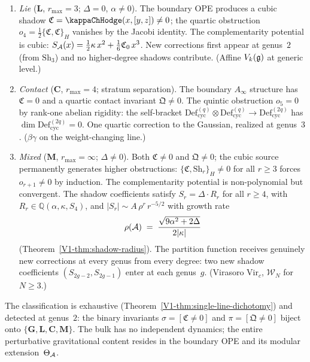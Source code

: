 \begin{theorem}
\begin{enumerate}[label=\textup{(\roman*)}]
\item \emph{Lie} ($\mathbf{L}$, $r_{\max} = 3$;
 $\Delta = 0$, $\alpha \neq 0$).
 The boundary OPE produces a cubic shadow
 $\mathfrak{C} = \kappaChHodge(x,[y,z]) \neq 0$;
 the quartic obstruction $o_4 =
 \tfrac{1}{2}\{\mathfrak{C},\mathfrak{C}\}_H$ vanishes
 by the Jacobi identity.
 The complementarity potential is cubic:
 $S_{\mathcal{A}}(x) = \tfrac{1}{2}\kappa\,x^2 +
 \tfrac{1}{6}\mathfrak{C}_0\,x^3$.
 New corrections first appear at genus~$2$
 \textup{(}from $\mathrm{Sh}_3$\textup{)} and no
 higher-degree shadows contribute.
 \textup{(}Affine $V_k(\mathfrak{g})$ at generic level.\textup{)}

\item \emph{Contact} ($\mathbf{C}$, $r_{\max} = 4$;
 stratum separation\textup{)}.
 The boundary $A_\infty$ structure has
 $\mathfrak{C} = 0$ and a quartic contact invariant
 $\mathfrak{Q} \neq 0$.
 The quintic obstruction $o_5 = 0$ by rank-one abelian
 rigidity: the self-bracket
 $\mathrm{Def}_{\mathrm{cyc}}^{(q)} \otimes
 \mathrm{Def}_{\mathrm{cyc}}^{(q)} \to
 \mathrm{Def}_{\mathrm{cyc}}^{(2q)}$ has
 $\dim\mathrm{Def}_{\mathrm{cyc}}^{(2q)} = 0$.
 One quartic correction to the Gaussian, realized at
 genus~$3$.
 \textup{(}$\beta\gamma$ on the weight-changing line.\textup{)}

\item \emph{Mixed} ($\mathbf{M}$, $r_{\max} = \infty$;
 $\Delta \neq 0$).
 Both $\mathfrak{C} \neq 0$ and $\mathfrak{Q} \neq 0$;
 the cubic source permanently generates higher obstructions:
 $\{\mathfrak{C}, \mathrm{Sh}_r\}_H \neq 0$ for all
 $r \geq 3$ forces $o_{r+1} \neq 0$ by induction.
 The complementarity potential is non-polynomial but
 convergent. The shadow coefficients satisfy
 $S_r = \Delta \cdot R_r$ for all $r \geq 4$, with
 $R_r \in \mathbb{Q}(\alpha, \kappa, S_4)$, and
 $|S_r| \sim A\,\rho^r\,r^{-5/2}$ with growth rate
 \[
 \rho(\mathcal{A})
 \;=\;
 \frac{\sqrt{9\alpha^2 + 2\Delta}}{2|\kappa|}
 \]
 \textup{(}Theorem~\textup{\ref*{V1-thm:shadow-radius}}\textup{)}.
 The partition function receives genuinely new corrections
 at every genus from every degree: two new shadow
 coefficients $(S_{2g-2}, S_{2g-1})$ enter at each genus~$g$.
 \textup{(}Virasoro $\mathrm{Vir}_c$, $\mathcal{W}_N$ for
 $N \geq 3$.\textup{)}
\end{enumerate}
The classification is exhaustive
\textup{(}Theorem~\textup{\ref*{V1-thm:single-line-dichotomy}}\textup{)}
and detected at genus~$2$: the binary invariants
$\sigma = [\mathfrak{C} \neq 0]$ and
$\pi = [\mathfrak{Q} \neq 0]$ biject onto
$\{\mathbf{G}, \mathbf{L}, \mathbf{C}, \mathbf{M}\}$.
The bulk has no independent dynamics; the entire perturbative
gravitational content resides in the boundary OPE and its
modular extension~$\Theta_{\mathcal{A}}$.
\end{theorem}

